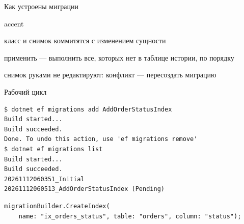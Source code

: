 \documentclass[aspectratio=169,10pt,t]{beamer}
\newcommand{\codexs}{\ttfamily\fontsize{7.0}{8.3}\selectfont}
\newcommand{\termsm}{\ttfamily\fontsize{6.6}{7.9}\selectfont}
\begin{document}
\begin{frame}{Как устроены миграции}
  \slidetop
  \begin{center}
  \end{center}

  \slidegap
  \begin{cbul}{accent}
    \item класс и снимок коммитятся  с изменением сущности
    \item применить --- выполнить все, которых нет в таблице истории, по порядку
    \item снимок руками не редактируют: конфликт --- пересоздать миграцию
  \end{cbul}
\end{frame}

\begin{frame}[fragile]{Рабочий цикл}
  \slidetop
\begin{lstlisting}[style=term,basicstyle=\termsm]
$ dotnet ef migrations add AddOrderStatusIndex
Build started...
Build succeeded.
Done. To undo this action, use 'ef migrations remove'
$ dotnet ef migrations list
Build started...
Build succeeded.
20261112060351_Initial
20261112060513_AddOrderStatusIndex (Pending)
\end{lstlisting}

\begin{lstlisting}[style=csharp,basicstyle=\codexs]
migrationBuilder.CreateIndex(
    name: "ix_orders_status", table: "orders", column: "status");
\end{lstlisting}

\end{frame}
\end{document}
